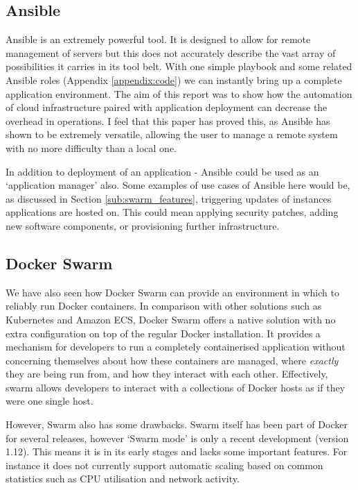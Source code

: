 \documentclass{article}
\begin{document}
\subsection{Ansible}
Ansible is an extremely powerful tool. It is designed to allow for remote management of servers but this does not accurately describe the vast array of possibilities it carries in its tool belt. With one simple playbook and some related Ansible roles (Appendix \ref{appendix:code}) we can instantly bring up a complete application environment. The aim of this report was to show how the automation of cloud infrastructure paired with application deployment can decrease the overhead in operations. I feel that this paper has proved this, as Ansible has shown to be extremely versatile, allowing the user to manage a remote system with no more difficulty than a local one.

In addition to deployment of an application - Ansible could be used as an `application manager' also. Some examples of use cases of Ansible here would be, as discussed in Section \ref{sub:swarm_features}, triggering updates of instances applications are hosted on. This could mean applying security patches, adding new software components, or provisioning further infrastructure.

\subsection{Docker Swarm}
We have also seen how Docker Swarm can provide an environment in which to reliably run Docker containers. In comparison with other solutions such as Kubernetes and Amazon ECS, Docker Swarm offers a native solution with no extra configuration on top of the regular Docker installation. It provides a mechanism for developers to run a completely containerised application without concerning themselves about how these containers are managed, where \textit{exactly} they are being run from, and how they interact with each other. Effectively, swarm allows developers to interact with a collections of Docker hosts as if they were one single host.

However, Swarm also has some drawbacks. Swarm itself has been part of Docker for several releases, however `Swarm mode' is only a recent development (version 1.12). This means it is in its early stages and lacks some important features. For instance it does not currently support automatic scaling based on common statistics such as CPU utilisation and network activity. 
\end{document}

